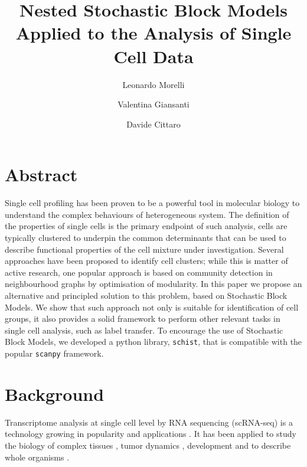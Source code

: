 \documentclass[10pt]{article}
\begin{document}
\title{Nested Stochastic Block Models Applied to the Analysis of Single Cell Data}
\author[1,2]{Leonardo Morelli}
\author[1,3]{Valentina Giansanti}
\author[1]{Davide Cittaro}
\maketitle

\section*{Abstract}

Single cell profiling has been proven to be a powerful tool in molecular biology to understand the complex behaviours of heterogeneous system. The definition of the  properties of single cells is the primary endpoint of such analysis, cells are typically clustered to underpin the common determinants that can be used to describe functional properties of the cell mixture under investigation. Several approaches have been proposed to identify cell clusters; while this is matter of active research, one popular approach is based on community detection in neighbourhood graphs by optimisation of modularity. In this paper we propose an alternative and principled solution to this problem, based on Stochastic Block Models. We show that such approach not only is suitable for identification of cell groups, it also provides a solid framework to perform other relevant tasks in single cell analysis, such as label transfer. To encourage the use of Stochastic Block Models, we developed a python library, \texttt{schist}, that is compatible with the popular \texttt{scanpy} framework.


\section*{Background}

Transcriptome analysis at single cell level by RNA sequencing (scRNA-seq) is a technology growing in popularity and applications \cite{svensson_2018}. It has been applied to study the biology of complex tissues \cite{guo_2018, ventotormo_2018}, tumor dynamics \cite{rozenblattrosen_2020, tirosh_2016, patel_2014, neftel_2019}, development \cite{rosenberg_2018, wagner_2018} and to describe whole organisms \cite{plass_2018, regev_2017}.
\end{document}
